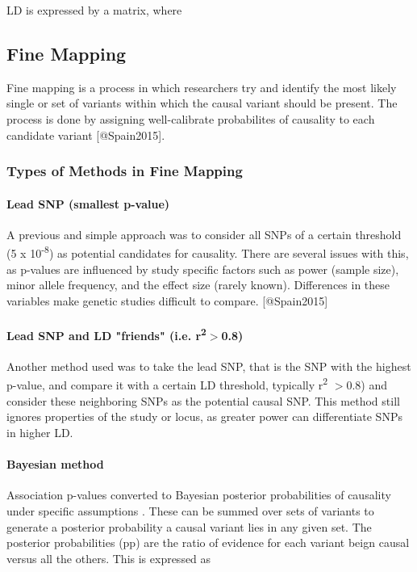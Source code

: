 LD is expressed by a matrix, where 

\subsection{Fine Mapping} 
Fine mapping is a process in which researchers try and identify the most likely single or set of variants within which the causal variant should be present. The process is done by assigning well-calibrate probabilites of causality to each candidate variant [@Spain2015]. 

\subsubsection{Types of Methods in Fine Mapping}

\paragraph{Lead SNP (smallest p-value)}
A previous and simple approach was to consider all SNPs of a certain threshold (5 x 10\textsuperscript{-8}) as potential candidates for causality. There are several issues with this, as p-values are influenced by study specific factors such as power (sample size), minor allele frequency, and the effect size (rarely known). Differences in these variables make genetic studies difficult to compare. [@Spain2015]


\paragraph{Lead SNP and LD "friends" (i.e. r\textsuperscript{2}$>$0.8)}

Another method used was to take the lead SNP, that is the SNP with the highest p-value, and compare it with a certain LD threshold, typically r\textsuperscript{2}	$>$0.8) and consider these neighboring SNPs as the potential causal SNP. This method still ignores properties of the study or locus, as greater power can differentiate SNPs in higher LD. 

\paragraph{Bayesian method}

Association p-values converted to Bayesian posterior probabilities of causality under specific assumptions \cite{Stephens2009} \cite{Wakefield2007}.  These can be summed over sets of variants to generate a posterior probability a causal variant lies in any given set. The posterior probabilities (pp) are the ratio of evidence for each variant beign causal versus all the others. This is expressed as 

